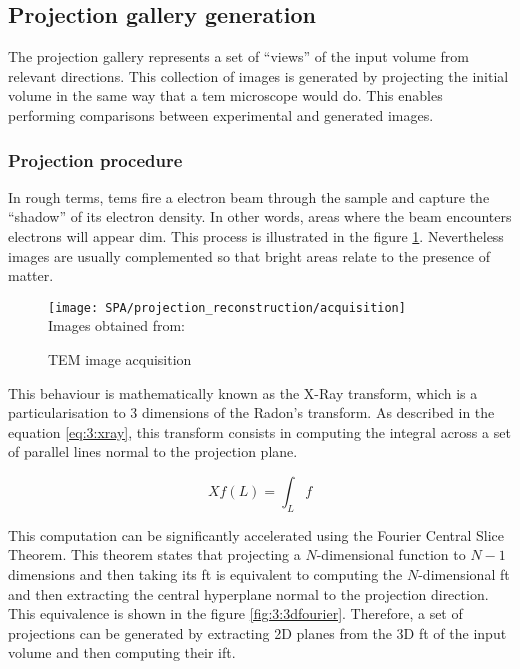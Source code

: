 \documentclass[../main.tex]{subfiles}
\begin{document}
\subsection{Projection gallery generation}
The projection gallery represents a set of ``views'' of the input volume from relevant directions. This collection of images is generated by projecting the initial volume in the same way that a \gls{tem} microscope would do. This enables performing comparisons between experimental and generated images. 

\subsubsection{Projection procedure}
In rough terms, \glspl{tem} fire a electron beam through the sample and capture the ``shadow'' of its electron density. In other words, areas where the beam encounters electrons will appear dim. This process is illustrated in the figure \ref{fig:3:projection}. Nevertheless images are usually complemented so that bright areas relate to the presence of matter.

\begin{figure}[h]
    \centering
    \texttt{[image: SPA/projection\_reconstruction/acquisition]}\\
    Images obtained from: \cite{greg}
    \caption{TEM image acquisition}
    \label{fig:3:projection}
\end{figure}

This behaviour is mathematically known as the X-Ray transform, which is a particularisation to 3 dimensions of the Radon's transform. As described in the equation \eqref{eq:3:xray}, this transform consists in computing the integral across a set of parallel lines normal to the projection plane.

\begin{equation}\label{eq:3:xray}
    Xf(L) = \int_L f
\end{equation}

This computation can be significantly accelerated using the Fourier Central Slice Theorem. This theorem states that projecting a $N$-dimensional function to $N-1$ dimensions and then taking its \gls{ft} is equivalent to computing the $N$-dimensional \gls{ft} and then extracting the central hyperplane normal to the projection direction. This equivalence is shown in the figure \ref{fig:3:3dfourier}. Therefore, a set of projections can be generated by extracting 2D planes from the 3D \gls{ft} of the input volume and then computing their \gls{ift}.
\end{document}
